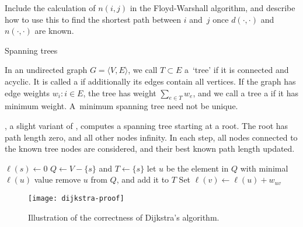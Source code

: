 \begin{exercise}
  Include the calculation of $n(i,j)$ in the Floyd-Warshall algorithm,
  and describe how to use this to find the shortest path between $i$
  and~$j$ once $d(\cdot,\cdot)$ and $n(\cdot,\cdot)$ are known.
\end{exercise}


 {Spanning trees}

In an undirected graph $G=\langle V,E\rangle$, we call $T\subset E$ a~`tree'
if it is connected and acyclic. It is called a 
if additionally its edges contain all vertices.
If the graph has edge weights
$w_i\colon i\in E$, the tree has weight $\sum_{e\in T} w_e$, and
we call a tree a  if it has minimum weight.
A~minimum spanning tree need not be unique.

, a slight variant of
, computes a spanning
tree starting at a root. The root has path length zero, and all other
nodes infinity.  In each step, all nodes connected to the known tree
nodes are considered, and their best known path length updated.

\begin{displayalgorithm}
  $\ell(s)\leftarrow 0$\;
  $Q\leftarrow V-\{s\}$ and $T\leftarrow \{s\}$\;
   {
    let $u$ be the element in $Q$ with minimal $\ell(u)$ value\;
    remove $u$ from $Q$, and add it to $T$\;
     {
       {Set $\ell(v)\leftarrow \ell(u)+w_{uv}$}
    }
  }
\end{displayalgorithm}

\begin{figure}[ht]
  \texttt{[image: dijkstra-proof]}
  \caption{Illustration of the correctness of Dijkstra's algorithm.}
  \label{fig:dijkstra-proof}
\end{figure}

